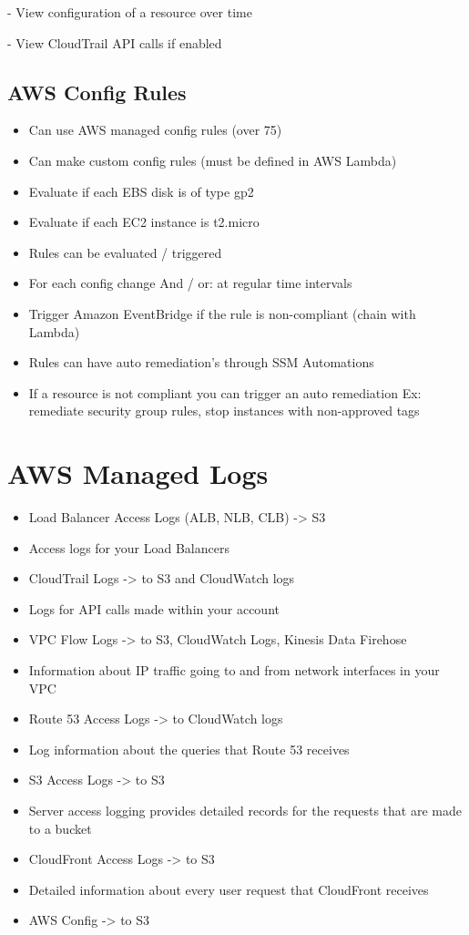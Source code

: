 - View configuration of a resource over time

- View CloudTrail API calls if enabled

\subsection{AWS Config Rules}
\begin{itemize}
    \item Can use AWS managed config rules (over 75)
    \item Can make custom config rules (must be defined in AWS Lambda)
    \item Evaluate if each EBS disk is of type gp2
    \item Evaluate if each EC2 instance is t2.micro
    \item Rules can be evaluated / triggered
    \item For each config change
    And / or: at regular time intervals
    \item Trigger Amazon EventBridge if the rule is non-compliant (chain with Lambda)
    \item Rules can have auto remediation's through SSM Automations
    \item If a resource is not compliant you can trigger an auto remediation
    Ex: remediate security group rules, stop instances with non-approved tags
\end{itemize}


\section{AWS Managed Logs}
\begin{itemize}
    \item Load Balancer Access Logs (ALB, NLB, CLB) -> S3
    \item Access logs for your Load Balancers
    \item CloudTrail Logs -> to S3 and CloudWatch logs
    \item Logs for API calls made within your account
    \item VPC Flow Logs -> to S3, CloudWatch Logs, Kinesis Data Firehose
    \item Information about IP traffic going to and from network interfaces in your VPC
    \item Route 53 Access Logs -> to CloudWatch logs
    \item Log information about the queries that Route 53 receives
    \item S3 Access Logs -> to S3
    \item Server access logging provides detailed records for the requests that are made to a bucket
    \item CloudFront Access Logs -> to S3
    \item Detailed information about every user request that CloudFront receives
    \item AWS Config -> to S3
\end{itemize}


